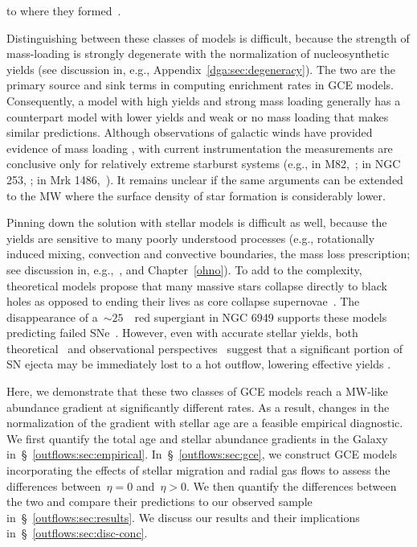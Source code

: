 to where they formed~\citep{Melioli2008, Melioli2009, Spitoni2008, Spitoni2009}.
\par
Distinguishing between these classes of models is difficult, because the
strength of mass-loading is strongly degenerate with the normalization of
nucleosynthetic yields (see discussion in, e.g.,
Appendix~\ref{dga:sec:degeneracy}).
The two are the primary source and sink terms in computing enrichment rates in
GCE models.
Consequently, a model with high yields and strong mass loading generally
has a counterpart model with lower yields and weak or no mass loading that
makes similar predictions.
Although observations of galactic winds have provided evidence of mass loading
\citep[see, e.g., the review by][]{Veilleux2020}, with current
instrumentation the measurements are conclusive only for relatively extreme
starburst systems (e.g., in M82,~\citealt{Lopez2020}; in NGC 253,
\citealt{Lopez2023}; in Mrk 1486,~\citealt{Cameron2021}).
It remains unclear if the same arguments can be extended to the MW where the
surface density of star formation is considerably lower.
\par
Pinning down the solution with stellar models is difficult as well, because the
yields are sensitive to many poorly understood processes (e.g., rotationally
induced mixing, convection and convective boundaries, the mass loss
prescription; see discussion in, e.g.,~\citealt{Romano2010, Griffith2021b,
Gil-Pons2022}, and Chapter~\ref{ohno}).
To add to the complexity, theoretical models propose that many massive stars
collapse directly to black holes as opposed to ending their lives as core
collapse supernovae~\citep[CCSNe;][]{OConnor2011, Pejcha2015, Ertl2016,
Sukhbold2016}.
The disappearance of a~$\sim$$25$~\msun~red supergiant in NGC 6949 supports
these models predicting failed SNe~\citep{Gerke2015, Adams2017, Basinger2021}.
However, even with accurate stellar yields, both theoretical~\citep{Peeples2011,
Christensen2018} and observational perspectives~\citep{Chisholm2018,
Cameron2021} suggest that a significant portion of SN ejecta may be immediately
lost to a hot outflow, lowering effective yields
\citep[see also][]{Dalcanton2007}.
\par
Here, we demonstrate that these two classes of GCE models reach a MW-like
abundance gradient at significantly different rates.
As a result, changes in the normalization of the gradient with stellar age are
a feasible empirical diagnostic.
We first quantify the total age and stellar abundance gradients in the Galaxy
in~\S~\ref{outflows:sec:empirical}.
In~\S~\ref{outflows:sec:gce}, we construct GCE models incorporating the effects
of stellar migration and radial gas flows to assess the differences
between~$\eta = 0$ and~$\eta > 0$.
We then quantify the differences between the two and compare their predictions
to our observed sample in~\S~\ref{outflows:sec:results}.
We discuss our results and their implications
in~\S~\ref{outflows:sec:disc-conc}.

